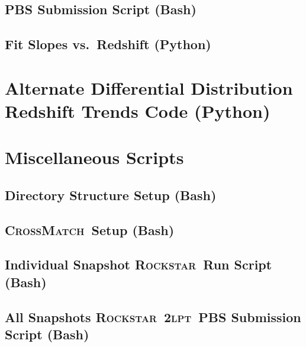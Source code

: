 \documentclass[12pt]{report}
\newcommand{\lpt}{\textsc{2lpt}}
\newcommand{\rockstar}{\textsc{Rockstar}}
\newcommand{\crossmatch}{\textsc{CrossMatch}}
\begin{document}
\begin{appendices}
	\section{PBS Submission Script (Bash)}
	\label{app:run_mass_trends}
	
	\section{Fit Slopes vs.\ Redshift (Python)}
	\label{app:mass_trends_redshift}
	

	\chapter{Alternate Differential Distribution Redshift Trends Code (Python)}
	\label{app:alt_redshift_trends}
	

	\chapter{Miscellaneous Scripts}
	\label{app:misc_scripts}
	\section{Directory Structure Setup (Bash)}
	\label{app:setup}
	
	\section{\crossmatch\ Setup (Bash)}
	\label{app:crossmatch_setup}
	
	\section{Individual Snapshot \rockstar\ Run Script (Bash)}
	\label{app:begin_run}
	
	\section{All Snapshots \rockstar\ \lpt\ PBS Submission Script (Bash)}
	\label{app:run_2lpt}
	

\end{appendices}
\end{document}
